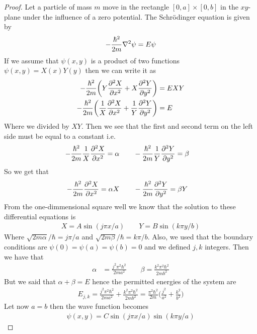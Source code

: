 \documentclass[11pt]{article}
\theoremstyle{definition}
\begin{document}
\cleardoublepage
\begin{proof}{2.3}
Let a particle of mass $m$ move in the rectangle $[0, a] \times [0, b]$
in the $xy$-plane under the influence of a zero potential.
The Schrödinger equation is given by
\begin{align*}
    -\frac{\hbar^2}{2m} \laplacian{\psi} = E\psi
\end{align*}
If we assume that $\psi(x,y)$ is a product of two functions
$\psi(x,y) = X(x)Y(y)$ then we can write it as
\begin{align*}
    -\frac{\hbar^2}{2m} \bigg(Y\pdv[2]{X}{x} + X\pdv[2]{Y}{y}\bigg) &= E XY\\
    -\frac{\hbar^2}{2m} \bigg(\frac{1}{X}\pdv[2]{X}{x} + \frac{1}{Y}\pdv[2]{Y}{y}\bigg) &= E
\end{align*}
Where we divided by $XY$. Then we see that the first and second term on the
left side must be equal to a constant i.e.
\begin{align*}
    -\frac{\hbar^2}{2m}\frac{1}{X}\pdv[2]{X}{x} &= \alpha
    \qquad
    -\frac{\hbar^2}{2m}\frac{1}{Y}\pdv[2]{Y}{y} = \beta
\end{align*}
So we get that
\begin{align*}
    -\frac{\hbar^2}{2m}\pdv[2]{X}{x} &= \alpha X
    \qquad
    -\frac{\hbar^2}{2m}\pdv[2]{Y}{y} = \beta Y
\end{align*}
From the one-dimmensional square well we know that the solution to these
differential equations is
\begin{align*}
    X = A \sin(j\pi x/a) \qquad Y = B \sin(k\pi y/b)
\end{align*}
Where $\sqrt{2m\alpha}/\hbar = j\pi/a$ and $\sqrt{2m\beta}/\hbar = k\pi/b$.
Also, we used that the boundary conditions are $\psi(0) = \psi(a) = \psi(b) = 0$
and we defined $j,k$ integers. Then we have that
\begin{align*}
    \alpha &=\frac{j^2\pi^2\hbar^2}{2ma^2}
    \qquad
    \beta =\frac{k^2\pi^2\hbar^2}{2mb^2}
\end{align*} 
But we said that $\alpha + \beta = E$ hence the permitted energies of the
system are
\begin{align*}
    E_{j,k} = \frac{j^2\pi^2\hbar^2}{2ma^2} + \frac{k^2\pi^2\hbar^2}{2mb^2}
    = \frac{\pi^2\hbar^2}{2m}\bigg(\frac{j^2}{a^2} + \frac{k^2}{b^2}\bigg)
\end{align*}
Let now $a = b$ then the wave function becomes 
\begin{align*}
    \psi(x,y) = C\sin(j\pi x/a)\sin(k\pi y/a)
\end{align*}

\end{proof}
\end{document}
